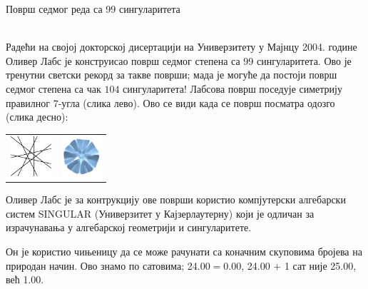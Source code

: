 ﻿\documentclass[en]{./../../common/SurferDesc}%
\begin{document}
\footnotesize


\begin{surferPage}
  \begin{surferTitle}Површ седмог реда са 99 сингуларитета\end{surferTitle}   \\
  
    Радећи на својој докторској дисертацији на Универзитету у Мајнцу 2004. године 
	Оливер Лабс је конструисао површ седмог степена са 99 сингуларитета. 
	Ово је тренутни светски рекорд за такве површи; мада је могуће да постоји површ 
	седмог степена са чак $104$ сингуларитета!  
    Лабсова површ поседује симетрију правилног $7$-угла (слика лево).
    Ово се види када се површ посматра одозго (слика десно):

    \vspace*{-0.3em}
    \begin{center}
      \begin{tabular}{c@{\qquad}c}
        \includegraphics[height=1.5cm]{./../../common/images/labsseptic1.pdf}
        &
        \includegraphics[height=1.5cm]{./../../common/images/labs_septic_von_oben}
      \end{tabular}
    \end{center}
    \vspace*{-0.3em}

    Оливер Лабс је за контрукцију ове површи користио компјутерски алгебарски систем 
    {\sc SINGULAR} (Универзитет у Кајзерлаутерну) који је одличан за израчунавања у 
	алгебарској геометрији и сингуларитете.

    Он је користио чињеницу да се може рачунати са коначним скуповима бројева на 
    природан начин. Ово знамо по сатовима; 24.00$=$0.00, 24.00 $+$ 1 сат није
    25.00, већ 1.00.

     
\end{surferPage}
\end{document}
